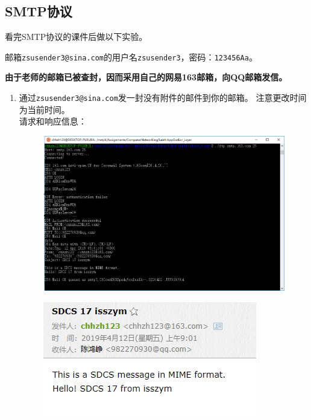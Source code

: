 \documentclass[logo,reportComp]{thesis}
\begin{document}
\subsection{SMTP协议}
看完SMTP协议的课件后做以下实验。
\par 邮箱\verb'zsusender3@sina.com'的用户名\verb'zsusender3'，密码：\verb'123456Aa'。
\par \textbf{由于老师的邮箱已被查封，因而采用自己的网易163邮箱，向QQ邮箱发信。}
\begin{enumerate}
\item 通过\verb'zsusender3@sina.com'发一封没有附件的邮件到你的邮箱。
注意更改时间为当前时间。\\
请求和响应信息：
\begin{figure}[H]
\centering
\includegraphics[width=0.8\linewidth]{fig/smtp-1.PNG}
\end{figure}
\begin{figure}[H]
\centering
\includegraphics[width=0.2\linewidth]{fig/smtp-11.PNG}
\end{figure}


\end{enumerate}
\end{document}
